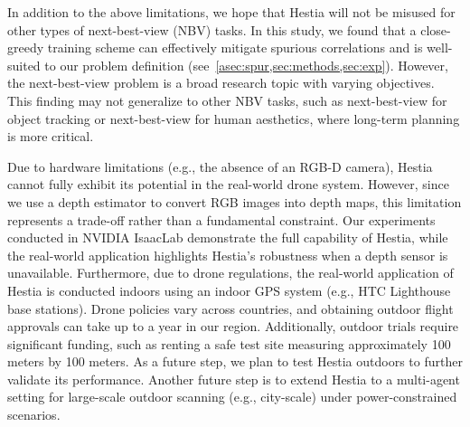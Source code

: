 In addition to the above limitations, we hope that Hestia will not be misused for other types of next-best-view (NBV) tasks.
In this study, we found that a close-greedy training scheme can effectively mitigate spurious correlations and is well-suited to our problem definition (see~\cref{asec:spur,sec:methods,sec:exp}).
However, the next-best-view problem is a broad research topic with varying objectives.
This finding may not generalize to other NBV tasks, such as next-best-view for object tracking or next-best-view for human aesthetics, where long-term planning is more critical.

Due to hardware limitations (e.g., the absence of an RGB-D camera), Hestia cannot fully exhibit its potential in the real-world drone system.
However, since we use a depth estimator to convert RGB images into depth maps, this limitation represents a trade-off rather than a fundamental constraint.
Our experiments conducted in NVIDIA IsaacLab demonstrate the full capability of Hestia, while the real-world application highlights Hestia's robustness when a depth sensor is unavailable.
Furthermore, due to drone regulations, the real-world application of Hestia is conducted indoors using an indoor GPS system (e.g., HTC Lighthouse base stations).
Drone policies vary across countries, and obtaining outdoor flight approvals can take up to a year in our region.
Additionally, outdoor trials require significant funding, such as renting a safe test site measuring approximately 100 meters by 100 meters.
As a future step, we plan to test Hestia outdoors to further validate its performance.
Another future step is to extend Hestia to a multi-agent setting for large-scale outdoor scanning (e.g., city-scale) under power-constrained scenarios.

